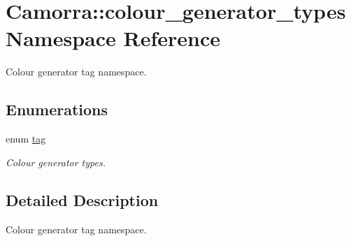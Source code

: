 \hypertarget{a00803}{
\section{Camorra::colour\_\-generator\_\-types Namespace Reference}
\label{a00803}
}


Colour generator tag namespace.  


\subsection*{Enumerations}
\begin{DoxyCompactItemize}
\item 
enum \hyperlink{a00803_a98a39cbb9c05b524c46601f2c4aae226}{tag} 
\begin{DoxyCompactList}\small\item\em Colour generator types. \end{DoxyCompactList}\end{DoxyCompactItemize}


\subsection{Detailed Description}
Colour generator tag namespace. 